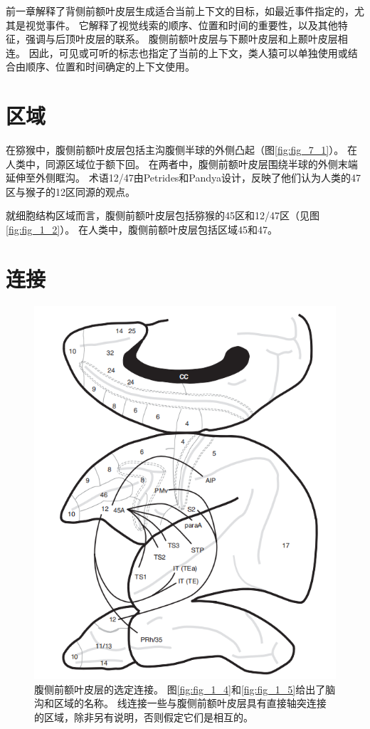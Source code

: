 前一章解释了背侧前额叶皮层生成适合当前上下文的目标，如最近事件指定的，尤其是视觉事件。
它解释了视觉线索的顺序、位置和时间的重要性，以及其他特征，强调与后顶叶皮层的联系。
腹侧前额叶皮层与下颞叶皮层和上颞叶皮层相连。
因此，可见或可听的标志也指定了当前的上下文，类人猿可以单独使用或结合由顺序、位置和时间确定的上下文使用。

\section{区域}
\par
在猕猴中，腹侧前额叶皮层包括主沟腹侧半球的外侧凸起（图\ref{fig:fig_7_1}）。
在人类中，同源区域位于额下回。
在两者中，腹侧前额叶皮层围绕半球的外侧末端延伸至外侧眶沟。
术语12/47由Petrides和Pandya设计，反映了他们认为人类的47区与猴子的12区同源的观点\cite{petrides2002comparative}。
\par
就细胞结构区域而言，腹侧前额叶皮层包括猕猴的45区和12/47区（见图\ref{fig:fig_1_2}）。
在人类中，腹侧前额叶皮层包括区域45和47。

\section{连接}
\begin{figure}
	\centering
	\includegraphics[width=0.7\linewidth]{image_pfc/Fig_7_2}
	\caption{腹侧前额叶皮层的选定连接。
		图\ref{fig:fig_1_4}和\ref{fig:fig_1_5}给出了脑沟和区域的名称。
		线连接一些与腹侧前额叶皮层具有直接轴突连接的区域，除非另有说明，否则假定它们是相互的。\label{fig:fig_7_2}}
\end{figure}

